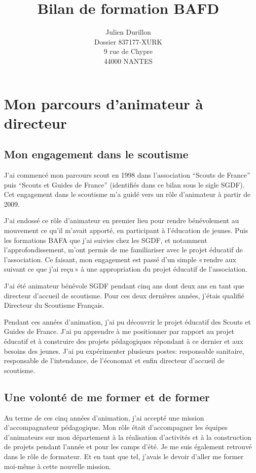 \documentclass[titlepage,11pt,a4paper]{article}
\title{Bilan de formation BAFD}
\author{Julien Durillon\\Dossier 837177-XURK\\9 rue de Chypre\\44000 NANTES}
\begin{document}
\maketitle


\section{Mon parcours d'animateur à directeur}

\subsection{Mon engagement dans le scoutisme}

J'ai commencé mon parcours scout en 1998 dans l'association ``Scouts de France'' puis ``Scouts et Guides
de France'' (identifiés dans ce bilan sous le sigle SGDF). Cet engagement dans le scoutisme
m'a guidé vers un rôle d'animateur à partir de 2009.

J'ai endossé ce rôle d'animateur en premier lieu pour rendre bénévolement au mouvement ce
qu'il m'avait apporté, en participant à l'éducation de jeunes. Puis les
formations BAFA que j'ai suivies chez les SGDF, et notamment l'approfondissement, m'ont
permis de me familiariser avec le projet éducatif de l'association. Ce faisant, mon
engagement est passé d'un simple «\,rendre aux suivant ce que j'ai reçu\,» à une
appropriation du projet éducatif de l'association.

J'ai été animateur bénévole SGDF pendant cinq ans dont deux ans en tant que directeur
d'accueil de scoutisme. Pour ces deux dernières années, j'étais qualifié Directeur du Scoutisme Français.

Pendant ces années d'animation, j'ai pu découvrir le projet éducatif des
Scouts et Guides de France. J'ai pu apprendre à me positionner par rapport au projet
éducatif et à construire des projets pédagogiques répondant à ce dernier et aux besoins
des jeunes. J'ai pu expérimenter plusieurs postes: responsable sanitaire,
responsable de l'intendance, de l'économat et enfin directeur d'accueil de scoutisme.

\subsection{Une volonté de me former et de former}

Au terme de ces cinq années d'animation, j'ai accepté une mission d’accompagnateur pédagogique.
Mon rôle était d'accompagner les équipes d'animateurs sur mon département à la réalisation
d'activités et à la construction de projets pendant l'année et pour les camps d'été.
Je me suis également retrouvé dans le rôle de formateur. Et en tant que tel, j'avais le
devoir d'aller me former moi-même à cette nouvelle mission.
\end{document}
